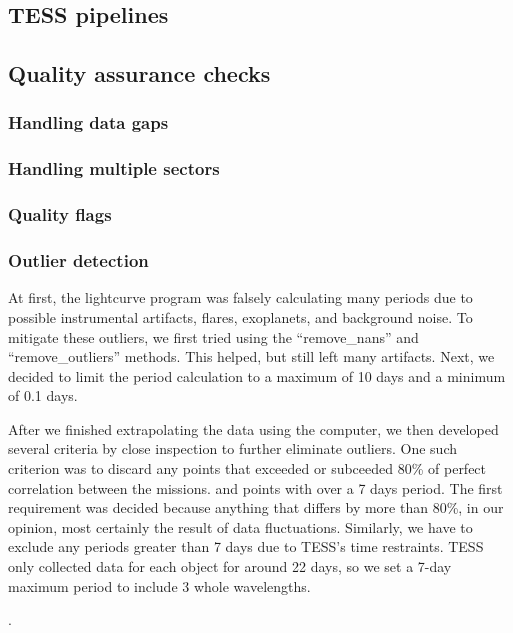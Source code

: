 \documentclass[modern]{aastex631}
\begin{document}
\subsection{TESS pipelines}


\subsection{Quality assurance checks}

\subsubsection{Handling data gaps}

\subsubsection{Handling multiple sectors}

\subsubsection{Quality flags}

\subsubsection{Outlier detection}

At first, the lightcurve program was falsely calculating many periods due to possible instrumental artifacts, flares, exoplanets, and background noise. To mitigate these outliers, we first tried using the \enquote{remove\_nans} and \enquote{remove\_outliers} methods. This helped, but still left many artifacts. Next, we decided to limit the period calculation to a maximum of 10 days and a minimum of 0.1 days.

After we finished extrapolating the data using the computer, we then developed several criteria by close inspection to further eliminate outliers. One such criterion was to discard any points that exceeded or subceeded 80\% of perfect correlation between the missions. and points with over a 7 days period. The first requirement was decided because anything that differs by more than 80\%, in our opinion, most certainly the result of data fluctuations. Similarly, we have to exclude any periods greater than 7 days due to TESS's time restraints. TESS only collected data for each object for around 22 days, so we set a 7-day maximum period to include 3 whole wavelengths.


.
\end{document}
